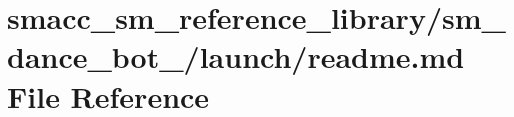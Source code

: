 \hypertarget{smacc__sm__reference__library_2sm__dance__bot__2_2launch_2readme_8md}{}\section{smacc\+\_\+sm\+\_\+reference\+\_\+library/sm\+\_\+dance\+\_\+bot\+\_/launch/readme.md File Reference}
\label{smacc__sm__reference__library_2sm__dance__bot__2_2launch_2readme_8md}
